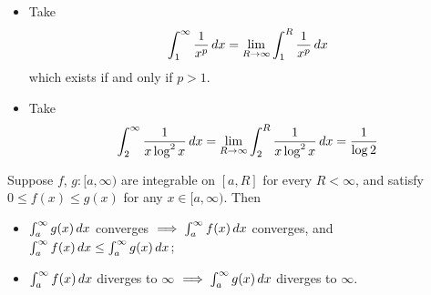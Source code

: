 \documentclass{../../template/note}
\begin{document}
    \begin{example*}
        \begin{itemize}
            \item Take
            \begin{align*}
                \int_1^\infty \frac{1}{x^p} \,d{x} = \lim_{R \to \infty} \int_1^R \frac{1}{x^p} \,d{x}
            \end{align*}
            which exists if and only if \(p > 1\).
            \item Take
            \begin{align*}
                \int_2^\infty \frac{1}{x \log^2 x }\,d{x} = \lim_{R \to \infty} \int_2^R \frac{1}{x \log^2 x}\,d{x} = \frac 1{\log 2}
            \end{align*}
        \end{itemize}
    \end{example*}
    
    \begin{proposition}
        Suppose \(f\), \(g: [a, \infty)\) are integrable on \([a, R]\) for every \(R < \infty\), and satisfy \(0 \leq f(x) \leq g(x)\) for any \(x \in [a, \infty)\). Then
        \begin{itemize}
            \item \(\int_a^\infty g(x) \,d{x}\) converges \(\implies \int_a^\infty f(x) \,d{x}\) converges, and \(\int_a^\infty f(x) \,d{x} \leq \int_a^\infty g(x) \,d{x}\);
            \item \(\int_a^\infty f(x) \,d{x}\) diverges to \(\infty\) \(\implies \int_a^\infty g(x) \,d{x}\) diverges to \(\infty\).
        \end{itemize}
    \end{proposition}
    
\end{document}
